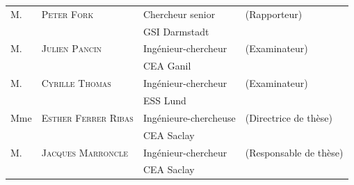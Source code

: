 \begin{titlepage}
\begin{textblock}{14}
\begin{center}
\begin{tabular}{llll}
        M.    & \textsc{Peter Fork}          & Chercheur senior        & (Rapporteur)           \\
        \null & \null                        & GSI Darmstadt           &                        \\ 
        M.    & \textsc{Julien Pancin}       & Ingénieur-chercheur     & (Examinateur)          \\
        \null & \null                        & CEA Ganil               &                        \\
        M.    & \textsc{Cyrille Thomas}      & Ingénieur-chercheur     & (Examinateur)          \\
        \null & \null                        & ESS Lund                &                        \\ 				
        Mme   & \textsc{Esther Ferrer Ribas} & Ingénieure-chercheuse   & (Directrice de thèse)  \\
        \null & \null                        & CEA Saclay              &                        \\ 
        
        M.    & \textsc{Jacques Marroncle}   & Ingénieur-chercheur     & (Responsable de thèse) \\
        \null & \null                        & CEA Saclay              &                        \\ 		
      \end{tabular}
    \end{center}
  \end{textblock}
\end{titlepage}